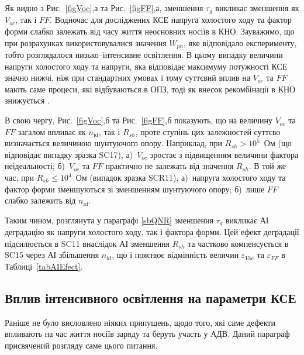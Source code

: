 Як видно з Рис.~\ref{figVoc},а та Рис.~\ref{figFF},а, зменшення $\tau_g$ викликає зменшення як $V_{oc}$, так і $F\!F$.
Водночас для досліджених КСЕ напруга холостого ходу та фактор форми слабко залежать від
часу життя неосновних носіїв в КНО.
Зауважимо, що при розрахунках використовувалися значення $W_{ph}$, яке відповідало експерименту,
тобто розглядалося низько--інтенсивне освітлення.
В цьому випадку величини напруги холостого ходу та напруги, яка відповідає максимуму потужності КСЕ значно нижчі,
ніж при стандартних умовах і тому суттєвий вплив на $V_{oc}$ та $F\!F$ мають саме процеси, які відбуваються
в ОПЗ, тоді як внесок рекомбінації в КНО знижується \cite{Breitenstein2013}.

В свою чергу, Рис.~\ref{figVoc},б та Рис.~\ref{figFF},б показують,
що на величину $V_{oc}$ та $F\!F$ загалом впливає як $n_\mathrm{id}$, так і $R_{sh}$,
проте ступінь цих залежностей суттєво визначається величиною шунтуючого опору.
Наприклад, при $R_{sh}>10^5$~Ом (що відповідає випадку зразка SC17),
а)~$V_{oc}$ зростає з підвищенням величини фактора неідеальності;
б)~$V_{oc}$ та $FF$ практично не залежать від значення $R_{sh}$.
В той же час, при $R_{sh}\leq10^4$~Ом (випадок зразка SCR11),
а)~напруга холостого ходу та фактор форми зменшуються зі зменшенням шунтуючого опору;
б)~лише $F\!F$ слабко залежить від $n_\mathrm{id}$.

Таким чином, розглянута у параграфі \ref{sbQNR} зменшення $\tau_g$ викликає АІ деградацію як напруги
холостого ходу, так і фактора форми.
Цей ефект деградації підсилюється в SC11 внаслідок АІ зменшення $R_{sh}$ та частково компенсується в SC15
через АІ збільшення $n_\mathrm{id}$, що і пояснює відмінність величин $\varepsilon_{Voc}$ та $\varepsilon_{FF}$ в Таблиці~\ref{tabAIEfect}.




\subsection{Вплив інтенсивного освітлення на параметри КСЕ\label{sbDefectType}}
Раніше не було висловлено ніяких припущень, щодо того, які саме дефекти впливають на час життя
носіїв заряду та беруть участь у АДВ.
Даний параграф присвячений розгляду саме цього питання.

